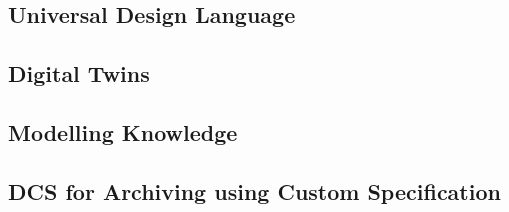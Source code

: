 \subsection{Universal Design Language}

\subsection{Digital Twins}

\subsection{Modelling Knowledge}

\subsection{DCS for Archiving using Custom Specification
}